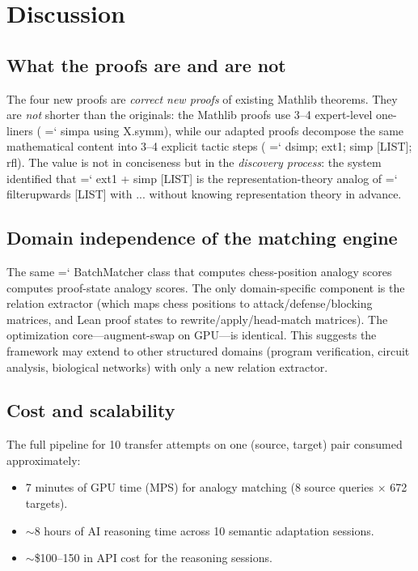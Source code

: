 \documentclass[11pt]{article}
\renewcommand{\texttt}[1]{%
  \begingroup\ttfamily\hyphenchar\font=`\-\relax
  \def\_{\textunderscore\discretionary{}{}{}}%
  #1\endgroup}
\theoremstyle{definition}
\theoremstyle{remark}
\begin{document}
\section{Discussion}\label{sec:discussion}

\subsection{What the proofs are and are not}

The four new proofs are \emph{correct new proofs} of
existing Mathlib theorems.  They are \emph{not} shorter than the
originals: the Mathlib proofs use 3--4 expert-level one-liners
(\texttt{simpa using X.symm}), while our adapted proofs decompose
the same mathematical content into 3--4 explicit tactic steps
(\texttt{dsimp; ext1; simp [LIST]; rfl}).  The value is not in
conciseness but in the \emph{discovery process}: the system
identified that \texttt{ext1 + simp [LIST]} is the
representation-theory analog of \texttt{filter\_upwards [LIST]
with ...} without knowing representation theory in advance.

\subsection{Domain independence of the matching engine}

The same \texttt{BatchMatcher} class that computes chess-position
analogy scores computes proof-state analogy scores.  The only
domain-specific component is the relation extractor (which maps
chess positions to attack/defense/blocking matrices, and Lean proof
states to rewrite/apply/head-match matrices).  The optimization
core---augment-swap on GPU---is identical.  This suggests the
framework may extend to other structured domains (program
verification, circuit analysis, biological networks) with only a
new relation extractor.

\subsection{Cost and scalability}

The full pipeline for 10 transfer attempts on one (source, target)
pair consumed approximately:
\begin{itemize}
\item 7 minutes of GPU time (MPS) for analogy matching (8 source
  queries $\times$ 672 targets).
\item ${\sim}$8 hours of AI reasoning time across 10 semantic
  adaptation sessions.
\item ${\sim}$\$100--150 in API cost for the reasoning sessions.
\end{itemize}
\end{document}
